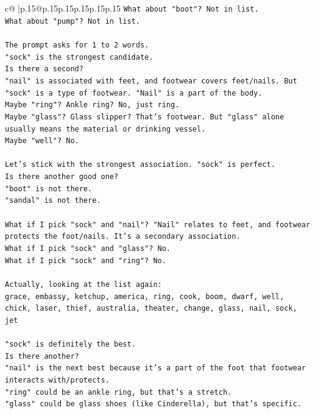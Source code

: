 \documentclass{article}
\begin{document}
{\begin{supertabular}{c@{$\;$}|p{.15\linewidth}@{}p{.15\linewidth}p{.15\linewidth}p{.15\linewidth}p{.15\linewidth}p{.15\linewidth}}
{{{\texttt{What about "boot"? Not in list.} \\
\texttt{What about "pump"? Not in list.} \\
\\ 
\texttt{The prompt asks for 1 to 2 words.} \\
\texttt{"sock" is the strongest candidate.} \\
\texttt{Is there a second?} \\
\texttt{"nail" is associated with feet, and footwear covers feet/nails. But "sock" is a type of footwear. "Nail" is a part of the body.} \\
\texttt{Maybe "ring"? Ankle ring? No, just ring.} \\
\texttt{Maybe "glass"? Glass slipper? That's footwear. But "glass" alone usually means the material or drinking vessel.} \\
\texttt{Maybe "well"? No.} \\
\\ 
\texttt{Let's stick with the strongest association. "sock" is perfect.} \\
\texttt{Is there another good one?} \\
\texttt{"boot" is not there.} \\
\texttt{"sandal" is not there.} \\
\\ 
\texttt{What if I pick "sock" and "nail"? "Nail" relates to feet, and footwear protects the foot/nails. It's a secondary association.} \\
\texttt{What if I pick "sock" and "glass"? No.} \\
\texttt{What if I pick "sock" and "ring"? No.} \\
\\ 
\texttt{Actually, looking at the list again:} \\
\texttt{grace, embassy, ketchup, america, ring, cook, boom, dwarf, well, chick, laser, thief, australia, theater, change, glass, nail, sock, jet} \\
\\ 
\texttt{"sock" is definitely the best.} \\
\texttt{Is there another?} \\
\texttt{"nail" is the next best because it's a part of the foot that footwear interacts with/protects.} \\
\texttt{"ring" could be an ankle ring, but that's a stretch.} \\
\texttt{"glass" could be glass shoes (like Cinderella), but that's specific.} \\
}}}
\end{supertabular}}
\end{document}
